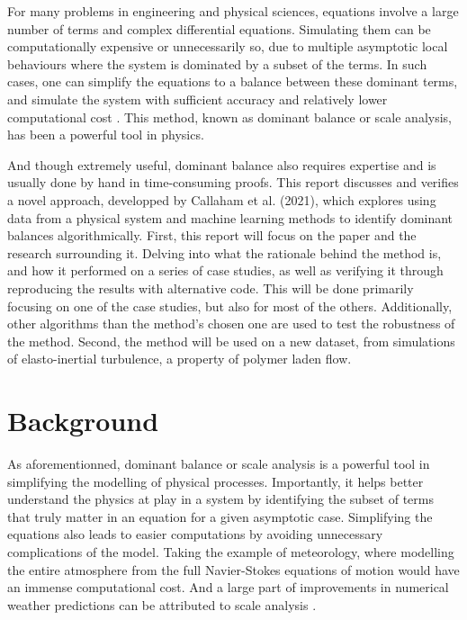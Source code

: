 \documentclass[12pt]{report} %
\begin{document}
\vspace{5mm}

For many problems in engineering and physical sciences, equations involve a large number of terms and complex differential equations. Simulating them can be computationally expensive or unnecessarily so, due to multiple asymptotic local behaviours where the system is dominated by a subset of the terms. In such cases, one can simplify the equations to a balance between these dominant terms, and simulate the system with sufficient accuracy and relatively lower computational cost \cite{charney1990scale}. This method, known as dominant balance or scale analysis, has been a powerful tool in physics.

\vspace{5mm}

And though extremely useful, dominant balance also requires expertise and is usually done by hand in time-consuming proofs. This report discusses and verifies a novel approach, developped by Callaham et al. (2021)\cite{callaham2021learning}, which explores using data from a physical system and machine learning methods to identify dominant balances algorithmically. First, this report will focus on the paper and the research surrounding it. Delving into what the rationale behind the method is, and how it performed on a series of case studies, as well as verifying it through reproducing the results with alternative code. This will be done primarily focusing on one of the case studies, but also for most of the others. Additionally, other algorithms than the method's chosen one are used to test the robustness of the method. Second, the method will be used on a new dataset, from simulations of elasto-inertial turbulence, a property of polymer laden flow.


\chapter{Background}


As aforementionned, dominant balance or scale analysis is a powerful tool in simplifying the modelling of physical processes. Importantly, it helps better understand the physics at play in a system by identifying the subset of terms that truly matter in an equation for a given asymptotic case. Simplifying the equations also leads to easier computations by avoiding unnecessary complications of the model. Taking the example of meteorology, where modelling the entire atmosphere from the full Navier-Stokes equations of motion would have an immense computational cost. And a large part of improvements in numerical weather predictions can be attributed to scale analysis \cite{charney1947dynamics, phillips1963geostrophic, burger1958scale, yano2009scale}.
\end{document}
